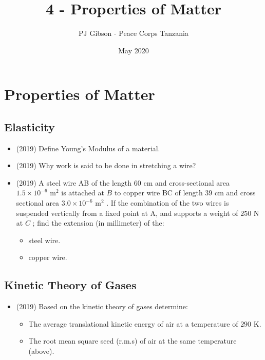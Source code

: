 \documentclass{article}
\title{4 - Properties of Matter}
\author{PJ Gibson - Peace Corps Tanzania}
\date{May 2020}
\begin{document}
\maketitle


\section{Properties of Matter}

\subsection{Elasticity}
\begin{itemize}
\item (2019)  Define Young’s Modulus of a material. 
\item (2019)  Why work is said to be done in stretching a wire? 
\item (2019)  A steel wire AB of the length $ 60$ cm and cross-sectional area $ 1.5 \times 10^{-6}$ m$ ^{2}$ is attached at $ B$ to copper wire BC of length $ 39$ cm and cross sectional area $ 3.0 \times 10^{-6}$ m$ ^{2}$ . If the combination of the two wires is suspended vertically from a fixed point at A, and supports a weight of $ 250$ N at $ C$ ; find the extension (in millimeter) of the:
 \begin{itemize}
\item steel wire. 
\item copper wire. 
\end{itemize}
\end{itemize}

\subsection{Kinetic Theory of Gases}
\begin{itemize}
\item (2019)  Based on the kinetic theory of gases determine:
 \begin{itemize}
\item The average translational kinetic energy of air at a temperature of $ 290$ K.
\item The root mean square seed (r.m.s) of air at the same temperature (above).
\end{itemize}
\end{itemize}
\end{document}
